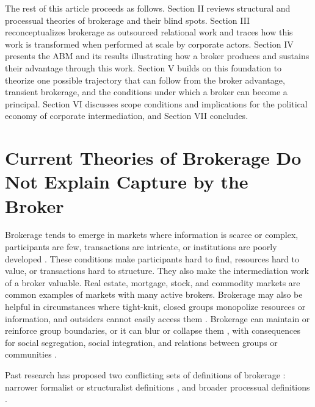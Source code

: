 \documentclass[
]{article}
\begin{document}
The rest of this article proceeds as follows. Section II reviews structural and processual theories of brokerage and their blind spots. Section III reconceptualizes brokerage as outsourced relational work and traces how this work is transformed when performed at scale by corporate actors. Section IV presents the ABM and its results illustrating how a broker produces and sustains their advantage through this work. Section V builds on this foundation to theorize one possible trajectory that can follow from the broker advantage, transient brokerage, and the conditions under which a broker can become a principal. Section VI discusses scope conditions and implications for the political economy of corporate intermediation, and Section VII concludes.

\section{Current Theories of Brokerage Do Not Explain Capture by the Broker}
\label{sec:brokerage-theory}

Brokerage tends to emerge in markets where information is scarce or complex, participants are few, transactions are intricate, or institutions are poorly developed \autocite{stovelStabilizingBrokerage2011}. These conditions make participants hard to find, resources hard to value, or transactions hard to structure. They also make the intermediation work of a broker valuable. Real estate, mortgage, stock, and commodity markets are common examples of markets with many active brokers. Brokerage may also be helpful in circumstances where tight-knit, closed groups monopolize resources or information, and outsiders cannot easily access them \autocite[140]{stovelBrokerage2012}. Brokerage can maintain or reinforce group boundaries, or it can blur or collapse them \autocite{stovelBrokerage2012}, with consequences for social segregation, social integration, and relations between groups or communities \autocite{galsterWordsDeedsRacial2005}.

Past research has proposed two conflicting sets of definitions of brokerage \autocite[see][for a review]{eriksonFormalistRelationalistTheory2013}: narrower formalist or structuralist definitions \autocite{burtStructuralHolesSocial1992,gouldStructuresMediationFormal1989,granovetterStrengthWeakTies1973,marsdenBrokerageBehaviorRestricted1982}, and broader processual definitions \autocite{obstfeldBrokerageProcessDecoupling2014,rossmanObfuscatoryRelationalWork2014,spiroExtendedStructuresMediation2013,stovelBrokerage2012}.
\end{document}
